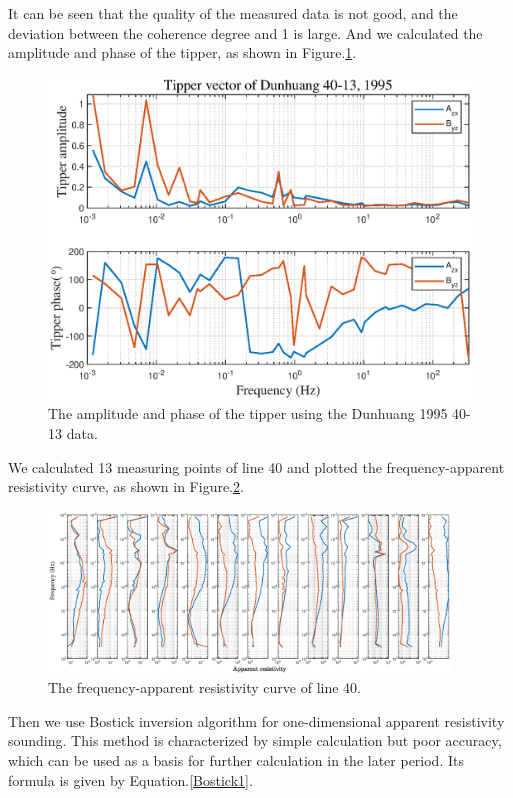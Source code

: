 \documentclass[9pt,a4paper,twoside]{rho-class/rho}
\begin{document}
It can be seen that the quality of the measured data is not good, and the deviation between the coherence degree and 1 is large. And we calculated the amplitude and phase of the tipper, as shown in Figure.\ref{fig:tp40-13}.

\begin{figure}[H]
    \centering
    \includegraphics[width=0.95\columnwidth]{figures/tp40-13.eps}
    \caption{The amplitude and phase of the tipper using the Dunhuang 1995 40-13 data.}
    \label{fig:tp40-13}
\end{figure}

We calculated 13 measuring points of line 40 and plotted the frequency-apparent resistivity curve, as shown in Figure.\ref{fig:Line40}.

\begin{figure}[pb]
    \centering
    \includegraphics[width=0.95\textwidth]{figures/Line40.eps}
    \caption{The frequency-apparent resistivity curve of line 40.}
    \label{fig:Line40}
\end{figure}

Then we use Bostick inversion algorithm for one-dimensional apparent resistivity sounding. This method is characterized by simple calculation but poor accuracy, which can be used as a basis for further calculation in the later period. Its formula is given by Equation.\eqref{Bostick1}.
\end{document}
